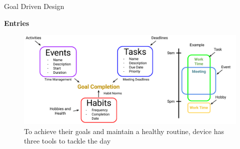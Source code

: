 \documentclass[final]{beamer}
\newlength{\colwidth}
\begin{document}
\begin{frame}[t]
\begin{columns}[t]
\begin{column}{\colwidth}
      \begin{block}{Goal Driven Design}

        \textbf{Entries}
        \begin{figure}
          \includegraphics[width = \textwidth]{entry_logic.pdf}
          \caption{To achieve their goals and maintain a healthy routine, device has
        three tools to tackle the day}
        \end{figure}

      \end{block}


\end{column}
\end{columns}
\end{frame}
\end{document}
